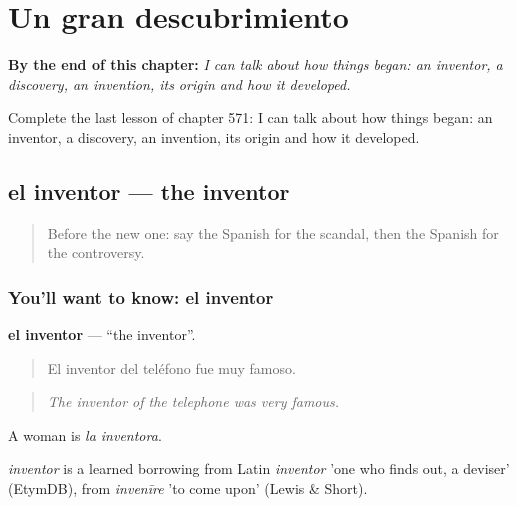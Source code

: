 
\chapter{Un gran descubrimiento}
\label{ch:es-un-gran-descubrimiento}

\begin{chapteropening}
\textbf{By the end of this chapter:} \emph{I can talk about how things began: an inventor, a discovery, an invention, its origin and how it developed.}

Complete the last lesson of chapter 571: I can talk about how things began: an inventor, a discovery, an invention, its origin and how it developed.
\end{chapteropening}

\section[el inventor]{el inventor — the inventor}

\label{lesson:ES-C571-inventor}



\begin{quote}
Before the new one: say the Spanish for the scandal, then the Spanish for the controversy.
\end{quote}

\subsection*{You'll want to know: el inventor}
\textbf{el inventor} — \textquotedblleft{}the inventor\textquotedblright{}.

\begin{quote}
El inventor del teléfono fue muy famoso.
\end{quote}

\begin{quote}
\emph{The inventor of the telephone was very famous.}
\end{quote}

A woman is \emph{la inventora}.

\begin{cousinweb}
\emph{inventor} is a learned borrowing from Latin \emph{inventor} 'one who finds out, a deviser' (EtymDB), from \emph{invenīre} 'to come upon' (Lewis \& Short).
\end{cousinweb}

